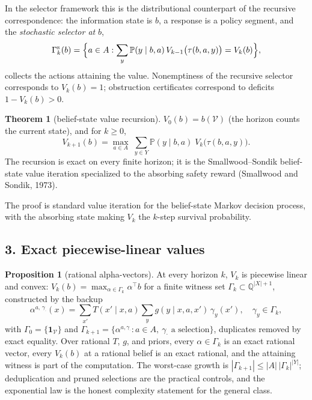 \documentclass[10pt,twocolumn]{article}
\theoremstyle{definition}
\newtheorem{theorem}{Theorem}
\newtheorem{proposition}{Proposition}
\begin{document}
In the selector framework this is the distributional counterpart of the
recursive correspondence: the information state is \(b\), a response is a
policy segment, and the \emph{stochastic selector at} \(b\),
\[
\Gamma^{\mathrm{s}}_{k}(b) = \Bigl\{ a \in A : \sum_{y} \mathbb{P}(y \mid
b, a)\, V_{k-1}\bigl(\tau(b, a, y)\bigr) = V_{k}(b) \Bigr\},
\]
collects the actions attaining the value. Nonemptiness of the recursive
selector corresponds to \(V_{k}(b) = 1\); obstruction certificates
correspond to deficits \(1 - V_{k}(b) > 0\).

\begin{theorem}[belief-state value recursion]\label{thm:recursion}
\(V_{0}(b) = b(\mathcal{V})\) (the horizon counts the current state), and
for \(k \ge 0\),
\[
V_{k+1}(b) = \max_{a \in A}\; \sum_{y \in Y} \mathbb{P}(y \mid b, a)\;
V_{k}\bigl(\tau(b, a, y)\bigr).
\]
The recursion is exact on every finite horizon; it is the Smallwood--Sondik
belief-state value iteration specialized to the absorbing safety reward
(Smallwood and Sondik, 1973).
\end{theorem}

The proof is standard value iteration for the belief-state Markov decision
process, with the absorbing state making \(V_{k}\) the \(k\)-step survival
probability.

\subsection{3. Exact piecewise-linear values}\label{exact}

\begin{proposition}[rational alpha-vectors]\label{prop:pl}
At every horizon \(k\), \(V_{k}\) is piecewise linear and convex:
\(V_{k}(b) = \max_{\alpha \in \Gamma_{k}} \alpha^{\top} b\) for a finite
witness set \(\Gamma_{k} \subset \mathbb{Q}^{|X|+1}\), constructed by the
backup
\[
\alpha^{a,\,\gamma_{\cdot}}(x) = \sum_{x'} T(x' \mid x, a)
\sum_{y} g(y \mid x, a, x')\, \gamma_{y}(x'),
\quad \gamma_{y} \in \Gamma_{k},
\]
with \(\Gamma_{0} = \{ \mathbf{1}_{\mathcal{V}} \}\) and
\(\Gamma_{k+1} = \{ \alpha^{a, \gamma_{\cdot}} : a \in A,\ \gamma_{\cdot}
\text{ a selection} \}\), duplicates removed by exact equality. Over
rational \(T\), \(g\), and priors, every \(\alpha \in \Gamma_{k}\) is an
exact rational vector, every \(V_{k}(b)\) at a rational belief is an exact
rational, and the attaining witness is part of the computation. The
worst-case growth is \(|\Gamma_{k+1}| \le |A|\,|\Gamma_{k}|^{|Y|}\);
deduplication and pruned selections are the practical controls, and the
exponential law is the honest complexity statement for the general class.
\end{proposition}
\end{document}

